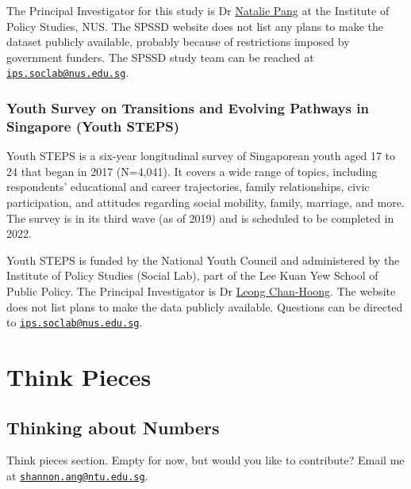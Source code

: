 \documentclass[
  openany]{book}
\begin{document}
The Principal Investigator for this study is Dr \href{https://lkyspp.nus.edu.sg/our-people/faculty/natalie-pang}{Natalie Pang} at the Institute of Policy Studies, NUS. The SPSSD website does not list any plans to make the dataset publicly available, probably because of restrictions imposed by government funders. The SPSSD study team can be reached at \href{mailto:ips.soclab@nus.edu.sg}{\nolinkurl{ips.soclab@nus.edu.sg}}.

\hypertarget{youth-survey-on-transitions-and-evolving-pathways-in-singapore-youth-steps}{%
\section{Youth Survey on Transitions and Evolving Pathways in Singapore (Youth STEPS)}\label{youth-survey-on-transitions-and-evolving-pathways-in-singapore-youth-steps}}

Youth STEPS is a six-year longitudinal survey of Singaporean youth aged 17 to 24 that began in 2017 (N=4,041). It covers a wide range of topics, including respondents' educational and career trajectories, family relationships, civic participation, and attitudes regarding social mobility, family, marriage, and more. The survey is in its third wave (as of 2019) and is scheduled to be completed in 2022.

Youth STEPS is funded by the National Youth Council and administered by the Institute of Policy Studies (Social Lab), part of the Lee Kuan Yew School of Public Policy. The Principal Investigator is Dr \href{http://lkyspp.splashinteractive.sg/ips/about-us/staff-directory/leong-chan-hoong}{Leong Chan-Hoong}. The website does not list plans to make the data publicly available. Questions can be directed to \href{mailto:ips.soclab@nus.edu.sg}{\nolinkurl{ips.soclab@nus.edu.sg}}.

\hypertarget{part-think-pieces}{%
\part{Think Pieces}\label{part-think-pieces}}

\hypertarget{think}{%
\chapter{Thinking about Numbers}\label{think}}

Think pieces section. Empty for now, but would you like to contribute? Email me at \href{mailto:shannon.ang@ntu.edu.sg}{\nolinkurl{shannon.ang@ntu.edu.sg}}.
\end{document}
